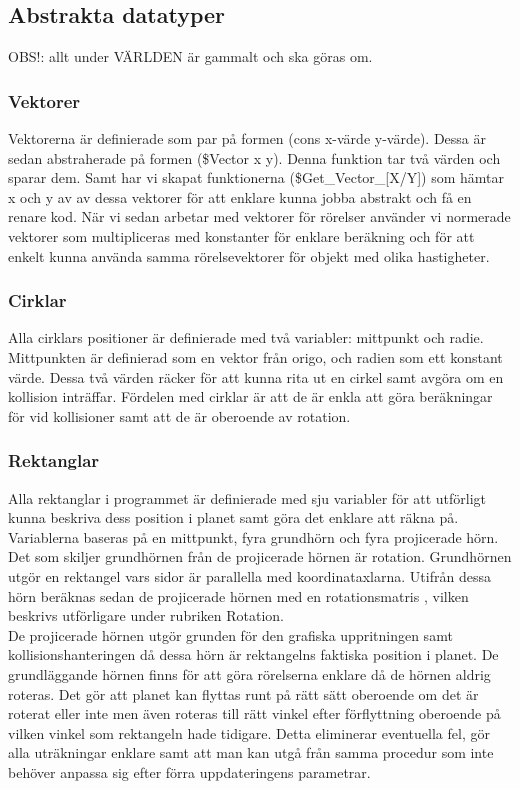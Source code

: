 \documentclass[12pt,a4paper]{article}
\begin{document}
\subsection{Abstrakta datatyper}
 OBS!: allt under VÄRLDEN är gammalt och ska göras om.

\subsubsection{Vektorer}
Vektorerna är definierade som par på formen (cons x-värde y-värde). Dessa är sedan abstraherade på formen (\$Vector x y). Denna funktion tar två värden och sparar dem. Samt har vi skapat funktionerna (\$Get\_Vector\_[X/Y]) som hämtar x och y av av dessa vektorer för att enklare kunna jobba abstrakt och få en renare kod. När vi sedan arbetar med vektorer för rörelser använder vi normerade vektorer som multipliceras med konstanter för enklare beräkning och för att enkelt kunna använda samma rörelsevektorer för objekt med olika hastigheter.

\subsubsection{Cirklar}
Alla cirklars positioner är definierade med två variabler: mittpunkt och radie. Mittpunkten är definierad som en vektor från origo, och radien som ett konstant värde. Dessa två värden räcker för att kunna rita ut en cirkel samt avgöra om en kollision inträffar. Fördelen med cirklar är att de är enkla att göra beräkningar för vid kollisioner samt att de är oberoende av rotation.

\subsubsection{Rektanglar}
Alla rektanglar i programmet är definierade med sju variabler för att utförligt kunna beskriva dess position i planet samt göra det enklare att räkna på. Variablerna baseras på en mittpunkt, fyra grundhörn och fyra projicerade hörn. Det som skiljer grundhörnen från de projicerade hörnen är rotation. Grundhörnen utgör en rektangel vars sidor är parallella med koordinataxlarna. Utifrån dessa hörn beräknas sedan de projicerade hörnen med en rotationsmatris , vilken beskrivs utförligare under rubriken Rotation.\\

De projicerade hörnen utgör grunden för den grafiska uppritningen samt kollisionshanteringen då dessa hörn är rektangelns faktiska position i planet. De grundläggande hörnen finns för att göra rörelserna enklare då de hörnen aldrig roteras. Det gör att planet kan flyttas runt på rätt sätt oberoende om det är roterat eller inte men även roteras till rätt vinkel efter förflyttning oberoende på vilken vinkel som rektangeln hade tidigare. Detta eliminerar eventuella fel, gör alla uträkningar enklare samt att man kan utgå från samma procedur som inte behöver anpassa sig efter förra uppdateringens parametrar.
\end{document}
